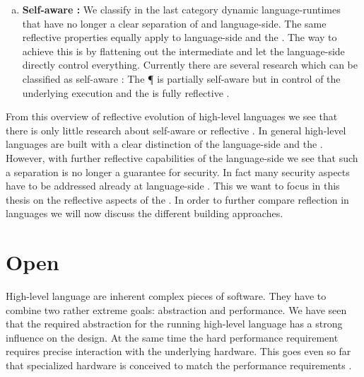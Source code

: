 \begin{enumerate}[a)]
\item \textbf{Self-aware \VM:}
	We classify in the last category dynamic language-runtimes that have no longer a clear separation of \VM and language-side.
	The same reflective properties equally apply to language-side and the \VM.
	The way to achieve this is by flattening out the intermediate \VM and let the language-side directly control everything.
	Currently there are several research \VMs which can be classified as self-aware \VMs: The \P \VM \cite{Verw12a} is partially self-aware but in control of the underlying execution and the \Klein \VM is fully reflective \cite{Unga05a}. 
\end{enumerate}

\noindent From this overview of reflective evolution of high-level languages we see that there is only little research about self-aware \VMs or reflective \VMs.
In general high-level languages are built with a clear distinction of the language-side and the \VM.
However, with further reflective capabilities of the language-side we see that such a separation is no longer a guarantee for security.
In fact many security aspects have to be addressed already at language-side \cite{??}.
This we want to focus in this thesis on the reflective aspects of the \VM.
In order to further compare reflection in languages we will now discuss the different \VM building approaches. 

\section{Open \VMs}

High-level language \VMs are inherent complex pieces of software.
They have to combine two rather extreme goals: abstraction and performance.
We have seen that the required abstraction for the running high-level language has a strong influence on the \VM design.
At the same time the hard performance requirement requires precise interaction with the underlying hardware.
This goes even so far that specialized hardware is conceived to match the performance requirements \cite{Clic05a}.

